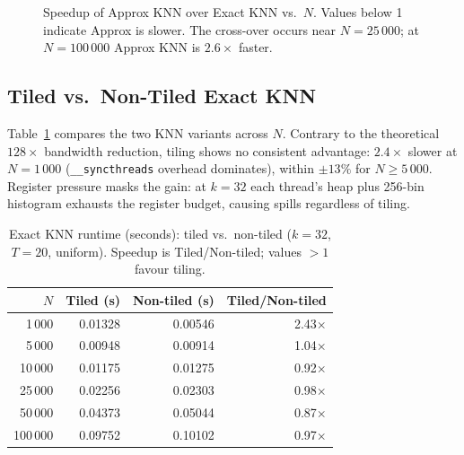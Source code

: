 \documentclass[11pt,a4paper]{article}
\begin{document}
\begin{figure}[H]
\centering
{}
\caption{Speedup of Approx KNN over Exact KNN vs.\ $N$.  Values below 1
indicate Approx is slower.  The cross-over occurs near $N=25\,000$; at
$N=100\,000$ Approx KNN is $2.6\times$ faster.}
\label{fig:speedup_n}
\end{figure}

\subsection{Tiled vs.\ Non-Tiled Exact KNN}

Table~\ref{tab:tiled_vs_notiled} compares the two KNN variants across $N$.
Contrary to the theoretical $128\times$ bandwidth reduction, tiling shows no
consistent advantage: $2.4\times$ slower at $N=1\,000$ (\texttt{\_\_syncthreads}
overhead dominates), within $\pm13\%$ for $N \ge 5\,000$.  Register pressure
masks the gain: at $k=32$ each thread's heap plus 256-bin histogram exhausts
the register budget, causing spills regardless of tiling.

\begin{table}[H]
\centering
\caption{Exact KNN runtime (seconds): tiled vs.\ non-tiled ($k=32$, $T=20$,
uniform).  Speedup is Tiled/Non-tiled; values $>1$ favour tiling.}
\label{tab:tiled_vs_notiled}
\begin{tabular}{rrrr}
\toprule
$N$ & Tiled (s) & Non-tiled (s) & Tiled/Non-tiled \\
\midrule
1\,000   & 0.01328 & 0.00546 & 2.43$\times$ \\
5\,000   & 0.00948 & 0.00914 & 1.04$\times$ \\
10\,000  & 0.01175 & 0.01275 & 0.92$\times$ \\
25\,000  & 0.02256 & 0.02303 & 0.98$\times$ \\
50\,000  & 0.04373 & 0.05044 & 0.87$\times$ \\
100\,000 & 0.09752 & 0.10102 & 0.97$\times$ \\
\bottomrule
\end{tabular}
\end{table}
\end{document}
